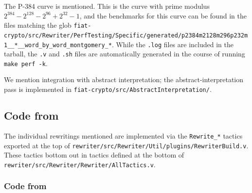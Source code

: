 \begin{subappendices}
The P-384 curve is mentioned.
This is the curve with prime modulus $2^{384} - 2^{128} - 2^{96} + 2^{32} - 1$, and the benchmarks for this curve can be found in the files matching the glob \texttt{fiat-crypto/src/Rewriter/PerfTesting/Specific/generated/p2384m2128m296p232m1\_\_*\_\_word\_by\_word\_montgomery\_*}.
While the \texttt{.log} files are included in the tarball, the \texttt{.v} and \texttt{.sh} files are automatically generated in the course of running \texttt{make perf -k}.

We mention integration with abstract interpretation; the abstract-interpretation pass is implemented in \texttt{fiat-crypto/src/AbstractInterpretation/}.

\subsection{Code from }

The individual rewritings mentioned are implemented via the \texttt{Rewrite\_*} tactics exported at the top of \texttt{rewriter/src/Rewriter/Util/plugins/RewriterBuild.v}.
These tactics bottom out in tactics defined at the bottom of \texttt{rewriter/src/Rewriter/Rewriter/AllTactics.v}.

\subsubsection{Code from } \label{sec:code:nine-steps}


\end{subappendices}
